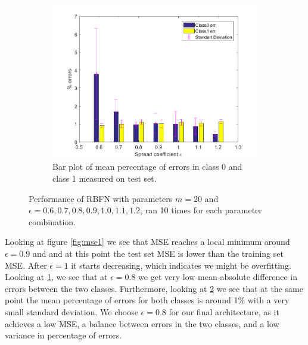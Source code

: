 \documentclass[a4paper, 11pt]{article}
\begin{document}
\begin{figure}[h!]
\begin{subfigure}[t]{0.32\textwidth}
        \label{fig:errorplot1}
    \end{subfigure}
    \hfill %
    \begin{subfigure}[t]{0.32\textwidth}
        \includegraphics[width=\textwidth]{../figures/perf/errorbar_m(20-20)_e(6-12).png}
        \caption{Bar plot of mean percentage of errors in class 0 and class 1 measured on test set.}
        \label{fig:errorbar1}
    \end{subfigure}
    \caption{Performance of RBFN with parameters $m = 20$ and $\epsilon = 0.6,0.7, 0.8, 0.9, 1.0, 1.1, 1.2$, ran 10  times for each parameter combination.}\label{fig:performance1}
\end{figure}


Looking at figure \ref{fig:mse1} we see that MSE reaches a local minimum around $\epsilon = 0.9$ and and at this point the test set MSE is lower than the training set MSE. After $\epsilon = 1$ it starts decreasing, which indicates we might be overfitting. Looking at \ref{fig:errorplot1}, we see that at $\epsilon = 0.8$ we get very low mean absolute difference in errors between the two classes. Furthermore, looking at \ref{fig:errorbar1} we see that at the same point the mean percentage of errors for both classes is around 1\% with a very small standard deviation. We choose $\epsilon = 0.8$ for our final architecture, as it  achieves a low MSE, a balance between errors in the two classes, and a low variance in percentage of errors.
\end{document}
